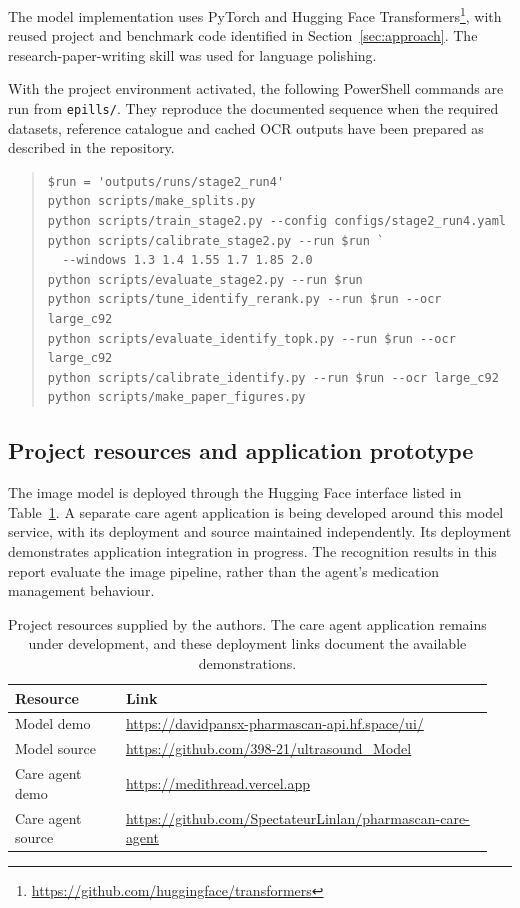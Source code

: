 The model implementation uses PyTorch and Hugging Face Transformers\footnote{\url{https://github.com/huggingface/transformers}}, with reused project and benchmark code identified in Section~\ref{sec:approach}. The research-paper-writing skill was used for language polishing.

With the project environment activated, the following PowerShell commands are run from \texttt{epills/}. They reproduce the documented sequence when the required datasets, reference catalogue and cached OCR outputs have been prepared as described in the repository. 

\begin{quote}\small
\begin{verbatim}
$run = 'outputs/runs/stage2_run4'
python scripts/make_splits.py
python scripts/train_stage2.py --config configs/stage2_run4.yaml
python scripts/calibrate_stage2.py --run $run `
  --windows 1.3 1.4 1.55 1.7 1.85 2.0
python scripts/evaluate_stage2.py --run $run
python scripts/tune_identify_rerank.py --run $run --ocr large_c92
python scripts/evaluate_identify_topk.py --run $run --ocr large_c92
python scripts/calibrate_identify.py --run $run --ocr large_c92
python scripts/make_paper_figures.py
\end{verbatim}
\end{quote}

\subsection{Project resources and application prototype}
\label{app:resources}
The image model is deployed through the Hugging Face interface listed in Table~\ref{tab:resources}. A separate care agent application is being developed around this model service, with its deployment and source maintained independently. Its deployment demonstrates application integration in progress. The recognition results in this report evaluate the image pipeline, rather than the agent's medication management behaviour.

\begin{table}[!htbp]
\centering\small
\caption{Project resources supplied by the authors. The care agent application remains under development, and these deployment links document the available demonstrations.}
\label{tab:resources}
\begin{tabular}{@{}p{0.22\linewidth}p{0.73\linewidth}@{}}
\toprule
Resource & Link \\
\midrule
Model demo & \url{https://davidpansx-pharmascan-api.hf.space/ui/} \\
Model source & \url{https://github.com/398-21/ultrasound_Model} \\
Care agent demo & \url{https://medithread.vercel.app} \\
Care agent source & \url{https://github.com/SpectateurLinlan/pharmascan-care-agent} \\
\bottomrule
\end{tabular}
\end{table}

